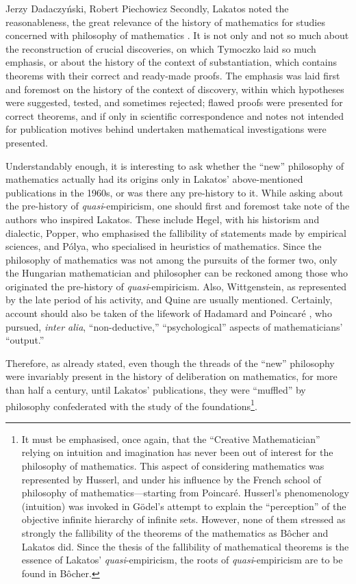 \begin{artengenv}{Jerzy Dadaczyński, Robert Piechowicz}
Secondly, Lakatos noted the reasonableness, the great relevance of the history of mathematics for studies concerned with philosophy of mathematics
\parencite[][p.2]{lakatos_proofs_1976}.
 It is not only and not so much about the reconstruction of crucial discoveries, on which Tymoczko laid so much emphasis, or about the history of the context of substantiation, which contains theorems with their correct and ready-made proofs. The emphasis was laid first and foremost on the history of the context of discovery, within which hypotheses were suggested, tested, and sometimes rejected; flawed proofs were presented for correct theorems, and if only in scientific correspondence and notes not intended for publication motives behind undertaken mathematical investigations were presented.

Understandably enough, it is interesting to ask whether the ``new'' philosophy of mathematics actually had its origins only in Lakatos' above-mentioned publications in the 1960s, or was there any pre-history to it. While asking about the pre-history of \textit{quasi}-empiricism, one should first and foremost take note of the authors who inspired Lakatos. These include Hegel, with his historism and dialectic, Popper, who emphasised the fallibility of statements made by empirical sciences, and Pólya, who specialised in heuristics of mathematics. Since the philosophy of mathematics was not among the pursuits of the former two, only the Hungarian mathematician and philosopher can be reckoned among those who originated the pre-history of \textit{quasi}-empiricism. Also, Wittgenstein, as represented by the late period of his activity, and Quine are usually mentioned. Certainly, account should also be taken of the lifework of Hadamard
\parencite*[][]{hadamard_psychology_1945}
 and Poincaré 
\parencite*[][]{poincare_valeur_1904},
 who pursued, \textit{inter alia}, ``non-deductive,'' ``psychological'' aspects of mathematicians' ``output.''

Therefore, as already stated, even though the threads of the ``new'' philosophy were invariably present in the history of deliberation on mathematics, for more than half a century, until Lakatos' publications, they were ``muffled'' by philosophy confederated with the study of the foundations\footnote{It must be emphasised, once again, that the ``Creative Mathematician'' relying on intuition and imagination has never been out of interest for the philosophy of mathematics. This aspect of considering mathematics was represented by Husserl, and under his influence by the French school of philosophy of mathematics---starting from Poincaré. Husserl's phenomenology (intuition) was invoked in Gödel's attempt to explain the ``perception'' of the objective infinite hierarchy of infinite sets. However, none of them stressed as strongly the fallibility of the theorems of the mathematics as Bôcher and Lakatos did. Since the thesis of the fallibility of mathematical theorems is the essence of Lakatos' \textit{quasi}-empiricism, the roots of \textit{quasi}-empiricism are to be found in Bôcher.}.


\end{artengenv}
